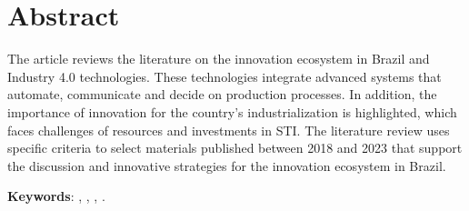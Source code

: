 

\section*{Abstract}

    The article reviews the literature on the innovation ecosystem in Brazil and Industry 4.0 technologies. These technologies integrate advanced systems that automate, communicate and decide on production processes. In addition, the importance of innovation for the country's industrialization is highlighted, which faces challenges of resources and investments in STI. The literature review uses specific criteria to select materials published between 2018 and 2023 that support the discussion and innovative strategies for the innovation ecosystem in Brazil.
 
\vspace{2cm}

\noindent\textbf{Keywords}: \KWone, \KWtwo,  \KWthree, \KWfour.

\newpage

